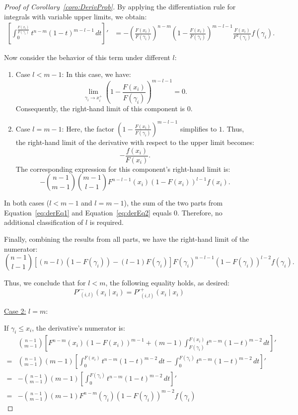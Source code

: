 \begin{proof}[Proof of Corollary~\ref{coro:DerivProb}]
By applying the differentiation rule for integrals with variable upper limits, we obtain:
\[
\begin{aligned}
    \left[ \int_0^{\frac{F(x_i)}{F(\gamma_i)}} t^{n-m}(1-t)^{m-l-1} \, dt \right]' 
    &= - \left( \frac{F(x_i)}{F(\gamma_i)} \right)^{n-m} \left( 1-\frac{F(x_i)}{F(\gamma_i)} \right)^{m-l-1} \frac{F(x_i)}{F^2(\gamma_i)} f(\gamma_i).
\end{aligned}
\]

Now consider the behavior of this term under different $l$:
\begin{enumerate}
\item Case \( l < m-1 \):  
   In this case, we have:
   \[
   \lim_{\gamma_i \to x_i^+} \left( 1-\frac{F(x_i)}{F(\gamma_i)} \right)^{m-l-1} = 0.
   \]
   Consequently, the right-hand limit of this component is \( 0 \).
\item Case \( l = m-1 \):
   Here, the factor \( \left( 1-\frac{F(x_i)}{F(\gamma_i)} \right)^{m-l-1} \) simplifies to \( 1 \). Thus, the right-hand limit of the derivative with respect to the upper limit becomes:
   \[
   -\frac{f(x_i)}{F(x_i)}.
   \]
   The corresponding expression for this component's right-hand limit is:
   \begin{equation} \label{eq:derEq2}
   -\binom{n-1}{m-1} \binom{m-1}{l-1} F^{n-l-1}(x_i) (1-F(x_i))^{l-1} f(x_i).
   \end{equation}
\end{enumerate}

In both cases (\( l < m-1 \) and \( l = m-1 \)), the sum of the two parts from Equation~\eqref{eq:derEq1} and Equation~\eqref{eq:derEq2} equals \( 0 \). Therefore, no additional classification of \( l \) is required.

Finally, combining the results from all parts, we have the right-hand limit of the numerator:
\[
\binom{n-1}{l-1} \left[ (n-l)(1-F(\gamma_i)) - (l-1)F(\gamma_i) \right] F(\gamma_i)^{n-l-1}(1-F(\gamma_i))^{l-2} f(\gamma_i).
\]

Thus, we conclude that for \( l < m \), the following equality holds, as desired:
\[
P'^{-}_{(i,l)}(x_i \mid x_i) = P'^{+}_{(i,l)}(x_i \mid x_i)
\]

\underline{Case 2:} \( l = m \):

If \( \gamma_i \leq x_i \), the derivative's numerator is:
\[
\begin{aligned}
    & \binom{n-1}{m-1} \left[ F^{n-m}(x_i)(1-F(x_i))^{m-1} + (m-1) \int_{F(\gamma_i)}^{F(x_i)} t^{n-m}(1-t)^{m-2} \, dt \right]' \\ 
    = & \binom{n-1}{m-1}(m-1) \left[ \int_{0}^{F(x_i)} t^{n-m}(1-t)^{m-2} \, dt - \int_{0}^{F(\gamma_i)} t^{n-m}(1-t)^{m-2} \, dt \right]' \\ 
    = & -\binom{n-1}{m-1}(m-1) \left[ \int_{0}^{F(\gamma_i)} t^{n-m}(1-t)^{m-2} \, dt \right]' \\
    = & -\binom{n-1}{m-1}(m-1) F^{n-m}(\gamma_i)(1-F(\gamma_i))^{m-2} f(\gamma_i)
\end{aligned}
\]


\end{proof}
